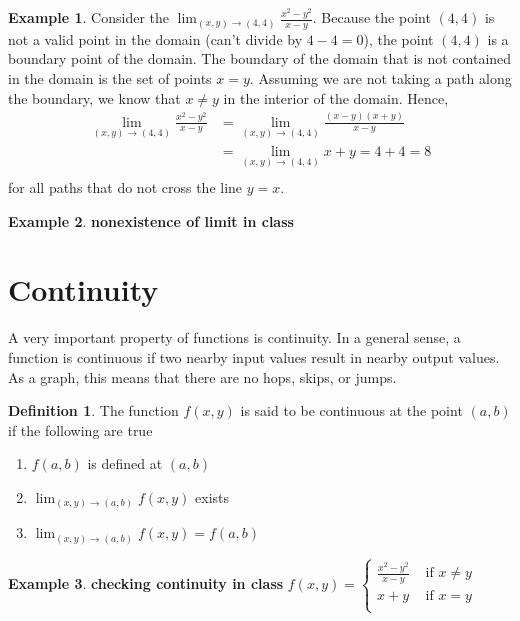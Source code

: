 \documentclass[
]{book}
\theoremstyle{definition}
\newtheorem{definition}{Definition}[chapter]
\theoremstyle{definition}
\newtheorem{example}{Example}[chapter]
\theoremstyle{definition}
\theoremstyle{definition}
\theoremstyle{remark}
\begin{document}
\begin{example}
Consider the \(\lim_{(x, y) \rightarrow (4, 4)} \frac{x^2 - y^2}{x - y}\). Because the point \((4, 4)\) is not a valid point in the domain (can't divide by \(4-4=0\)), the point \((4, 4)\) is a boundary point of the domain. The boundary of the domain that is not contained in the domain is the set of points \(x = y\). Assuming we are not taking a path along the boundary, we know that \(x \neq y\) in the interior of the domain. Hence,
\[
\begin{aligned}
\lim_{(x, y) \rightarrow (4, 4)} \frac{x^2 - y^2}{x - y} & = \lim_{(x, y) \rightarrow (4, 4)} \frac{(x - y)(x + y)}{x - y} \\
& = \lim_{(x, y) \rightarrow (4, 4)} x + y  = 4 + 4 = 8\\
\end{aligned}
\]
for all paths that do not cross the line \(y = x\).
\end{example}

\begin{example}
\textbf{nonexistence of limit in class}
\end{example}

\hypertarget{continuity}{%
\section{Continuity}\label{continuity}}

A very important property of functions is continuity. In a general sense, a function is continuous if two nearby input values result in nearby output values. As a graph, this means that there are no hops, skips, or jumps.

\begin{definition}

The function \(f(x, y)\) is said to be continuous at the point \((a, b)\) if the following are true

\begin{enumerate}
\def\labelenumi{\arabic{enumi})}
\item
  \(f(a, b)\) is defined at \((a, b)\)
\item
  \(\lim_{(x, y) \rightarrow (a, b)} f(x, y)\) exists
\item
  \(\lim_{(x, y) \rightarrow (a, b)} f(x, y) = f(a, b)\)
\end{enumerate}

\end{definition}

\begin{example}
\textbf{checking continuity in class}
\(f(x, y) = \begin{cases} \frac{x^2 - y^2}{x - y} & \mbox{ if } x \neq y \\ x + y & \mbox{ if } x = y \\ \end{cases}\)
\end{example}
\end{document}
